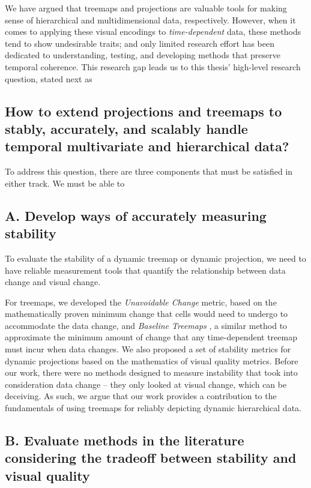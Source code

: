 We have argued that treemaps and projections are valuable tools for making sense of hierarchical and multidimensional data, respectively. However, when it comes to applying these visual encodings to \emph{time-dependent} data, these methods tend to show undesirable traits; and only limited research effort has been dedicated to understanding, testing, and developing methods that preserve temporal coherence. This research gap leads us to this thesis' high-level research question, stated next as

\subsection*{How to extend projections and treemaps to stably, accurately, and scalably handle temporal multivariate and hierarchical data?}

To address this question, there are three components that must be satisfied in either track. We must be able to

\subsection*{A. Develop ways of accurately measuring stability}

To evaluate the stability of a dynamic treemap or dynamic projection, we need to have reliable measurement tools that quantify the relationship between data change and visual change.

For treemaps, we developed the \emph{Unavoidable Change} \citep{vernier18software} metric, based on the mathematically proven minimum change that cells would need to undergo to accommodate the data change, and \emph{Baseline Treemaps} \citep{vernier_treemap}, a similar method to approximate the minimum amount of change that any time-dependent treemap must incur when data changes. We also proposed a set of stability metrics for dynamic projections based on the mathematics of visual quality metrics.
Before our work, there were no methods designed to measure instability that took into consideration data change -- they only looked at visual change, which can be deceiving. As such, we argue that our work provides a contribution to the fundamentals of using treemaps for reliably depicting dynamic hierarchical data.

\subsection*{B. Evaluate methods in the literature considering the tradeoff between stability and visual quality}

